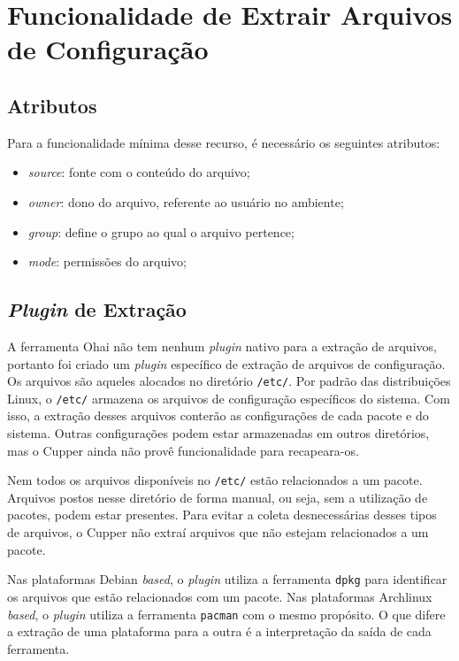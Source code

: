 \section{Funcionalidade de Extrair Arquivos de Configuração}
\label{sec:files}

\subsection{Atributos}

Para a funcionalidade mínima desse recurso, é necessário os seguintes
atributos:

\begin{itemize}
  \item \textit{source}: fonte com o conteúdo do arquivo;
  \item \textit{owner}: dono do arquivo, referente ao usuário no ambiente;
  \item \textit{group}: define o grupo ao qual o arquivo pertence;
  \item \textit{mode}: permissões do arquivo;
\end{itemize}

\subsection{\textit{Plugin} de Extração}

A ferramenta Ohai não tem nenhum \textit{plugin} nativo para a extração de arquivos, portanto
foi criado um \textit{plugin} específico de extração de arquivos de configuração. Os arquivos
são aqueles alocados no diretório \texttt{/etc/}. Por padrão das distribuições Linux,
o \texttt{/etc/} armazena os arquivos de configuração específicos do sistema.
Com isso, a extração desses arquivos conterão as configurações de cada pacote e do
sistema. Outras configurações podem estar armazenadas em outros diretórios,
mas o Cupper ainda não provê funcionalidade para recapeara-os. %

Nem todos os arquivos disponíveis no \texttt{/etc/} estão relacionados a um pacote.
Arquivos postos nesse diretório de forma manual, ou seja, sem a utilização de pacotes,
podem estar presentes. Para evitar a coleta desnecessárias desses tipos de arquivos,
o Cupper não extraí arquivos que não estejam relacionados a um pacote.

Nas plataformas Debian \textit{based}, o \textit{plugin} utiliza a ferramenta \texttt{dpkg}
para identificar os arquivos que estão relacionados com um pacote. Nas plataformas
Archlinux \textit{based}, o \textit{plugin} utiliza a ferramenta \texttt{pacman} com o mesmo propósito.
O que difere a extração de uma plataforma para a outra é a interpretação da saída
de cada ferramenta.

